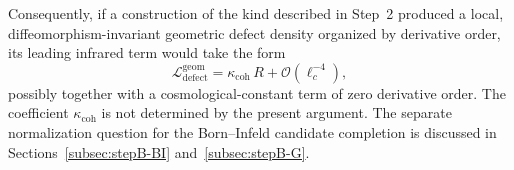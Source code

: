     Consequently, if a construction of the kind described in Step~2 produced a local, diffeomorphism-invariant
    geometric defect density organized by derivative order, its leading infrared term would take the form
    \begin{equation}
      \mathcal{L}_{\mathrm{defect}}^{\mathrm{geom}}
      = \kappa_{\mathrm{coh}}\, R
      + \mathcal{O}(\ell_c^{-4}),
      \label{eq:defect-IR-expansion}
    \end{equation}
    possibly together with a cosmological-constant term of zero derivative order.
    The coefficient $\kappa_{\mathrm{coh}}$ is not determined by the present argument.
    The separate normalization question for the Born--Infeld candidate completion is discussed in
    Sections~\ref{subsec:stepB-BI} and~\ref{subsec:stepB-G}.
